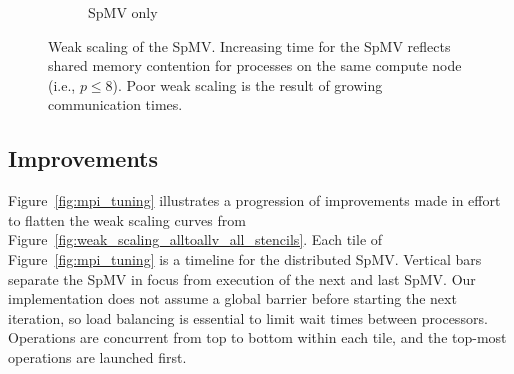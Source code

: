 \documentclass{report}
\begin{document}
\begin{figure}
\begin{subfigure}{0.48\textwidth}
\caption{SpMV only}
\label{fig:weak_scaling_spmv_only_alltoallv_all_stencils}
\end{subfigure}
\caption{Weak scaling of the SpMV. Increasing time for the SpMV reflects shared memory contention for processes on the same compute node (i.e., $p\leq 8$). Poor weak scaling is the result of growing communication times. }
\end{figure}


\subsection{Improvements}


Figure~\ref{fig:mpi_tuning} illustrates a progression of improvements made in effort to flatten the weak scaling curves from Figure~\ref{fig:weak_scaling_alltoallv_all_stencils}. Each tile of Figure~\ref{fig:mpi_tuning} is a timeline for the distributed SpMV. Vertical bars separate the SpMV in focus from execution of the next and last SpMV. Our implementation does not assume a global barrier before starting the next iteration, so load balancing is essential to limit wait times between processors. Operations are concurrent from top to bottom within each tile, and the top-most operations are launched first.

\end{document}
